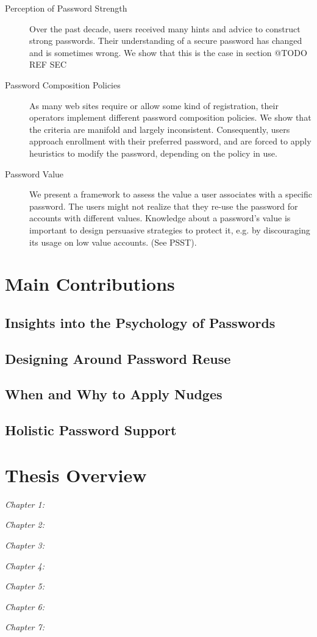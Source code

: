 \begin{description}
\item[Perception of Password Strength] Over the past decade, users received many hints and advice to construct strong passwords. Their understanding of a secure password has changed and is sometimes wrong. We show that this is the case in section @TODO REF SEC

\item[Password Composition Policies] As many web sites require or allow some kind of registration, their operators implement different password composition policies. We show that the criteria are manifold and largely inconsistent. Consequently, users approach enrollment with their preferred password, and are forced to apply heuristics to modify the password, depending on the policy in use. 

\item[Password Value] We present a framework to assess the value a user associates with a specific password. The users might not realize that they re-use the password for accounts with different values. Knowledge about a password's value is important to design persuasive strategies to protect it, e.g. by discouraging its usage on low value accounts. (See PSST).
\end{description}


\section{Main Contributions}
\subsection{Insights into the Psychology of Passwords}
\subsection{Designing Around Password Reuse}
\subsection{When and Why to Apply Nudges}
\subsection{Holistic Password Support}


\section{Thesis Overview}
\textit{Chapter 1:}

\textit{Chapter 2:}

\textit{Chapter 3:}

\textit{Chapter 4:}

\textit{Chapter 5:}

\textit{Chapter 6:}

\textit{Chapter 7:}




